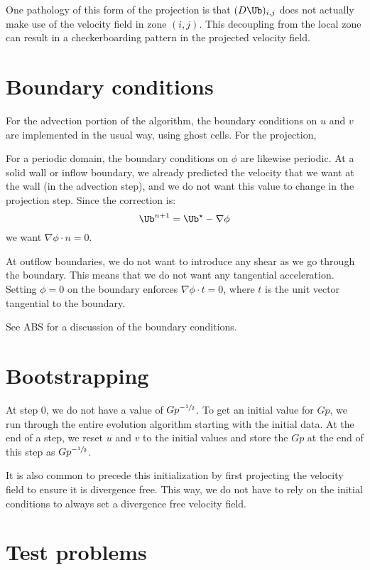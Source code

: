 One pathology of this form of the projection is that $(D\Ub)_{i,j}$ does
not actually make use of the velocity field in zone $(i,j)$.  This
decoupling from the local zone can result in a checkerboarding pattern
in the projected velocity field.

\section{Boundary conditions}

For the advection portion of the algorithm, the boundary conditions
on $u$ and $v$ are implemented in the usual way, using ghost cells.
For the projection,

For a periodic domain, the boundary conditions on $\phi$ are likewise
periodic.  At a solid wall or inflow boundary, we already predicted
the velocity that we want at the wall (in the advection step), and we
do not want this value to change in the projection step.  Since the
correction is:
\begin{equation}
\Ub^{n+1} = \Ub^\star - \nabla \phi
\end{equation}
we want $\nabla \phi \cdot n = 0$.

At outflow boundaries, we do not want to introduce any shear as we go
through the boundary.  This means that we do not want any tangential
acceleration.  Setting $\phi = 0$ on the boundary enforces $\nabla
\phi \cdot t = 0$, where $t$ is the unit vector tangential to the
boundary.

See ABS for a discussion of the boundary conditions.

\section{Bootstrapping}

At step 0, we do not have a value of $Gp^{-{\sfrac{1}{2}}}$.  To get an initial value
for $Gp$, we run through the entire evolution algorithm starting with the
initial data.  At the end of a step, we reset $u$ and $v$ to the initial
values and store the $Gp$ at the end of this step as $Gp^{-{\sfrac{1}{2}}}$.

It is also common to precede this initialization by first projecting
the velocity field to ensure it is divergence free.  This way, we do
not have to rely on the initial conditions to always set a divergence
free velocity field.


\section{Test problems}

